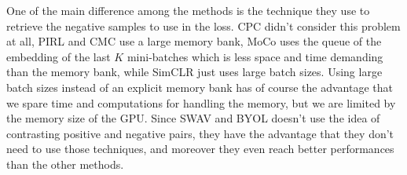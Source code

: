 One of the main difference among the methods is the technique they use to retrieve the negative samples to use in the loss. CPC didn't consider this problem at all, PIRL and CMC use a large memory bank, MoCo uses the queue of the embedding of the last $K$ mini-batches which is less space and time demanding than the memory bank, while SimCLR just uses large batch sizes. Using large batch sizes instead of an explicit memory bank has of course the advantage that we spare time and computations for handling the memory, but we are limited by the memory size of the GPU. Since SWAV and BYOL doesn't use the idea of contrasting positive and negative pairs, they have the advantage that they don't need to use those techniques, and moreover they even reach better performances than the other methods.